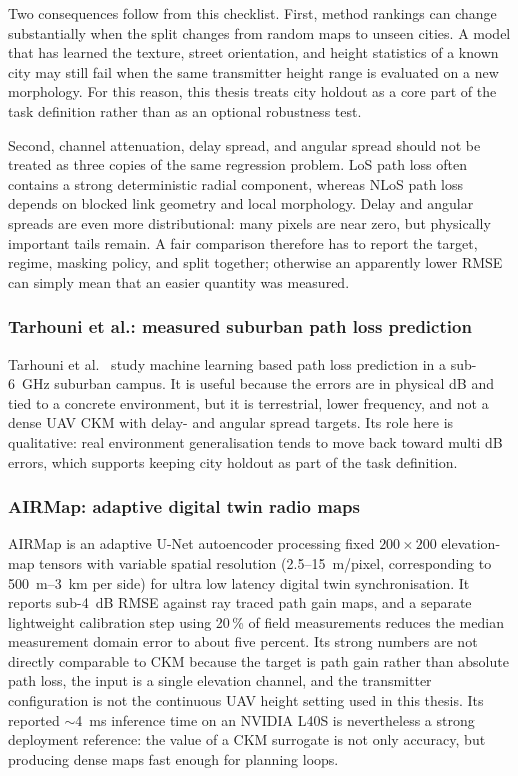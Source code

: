 Two consequences follow from this checklist. First, method rankings can change
substantially when the split changes from random maps to unseen cities. A model
that has learned the texture, street orientation, and height statistics of a
known city may still fail when the same transmitter height range is evaluated
on a new morphology. For this reason, this thesis treats city holdout as a
core part of the task definition rather than as an optional robustness test.

Second, channel attenuation, delay spread, and angular spread should not be treated as
three copies of the same regression problem. LoS path loss often contains a
strong deterministic radial component, whereas NLoS path loss depends on
blocked link geometry and local morphology. Delay and angular spreads are even
more distributional: many pixels are near zero, but physically important tails
remain. A fair comparison therefore has to report the target, regime, masking
policy, and split together; otherwise an apparently lower RMSE can simply mean
that an easier quantity was measured.

\subsubsection{Tarhouni et al.: measured suburban path loss prediction}

Tarhouni et al.\ \cite{tarhouni2025} study machine learning based path loss
prediction in a sub-\SI{6}{GHz} suburban campus. It is useful because the errors
are in physical dB and tied to a concrete environment, but it is terrestrial,
lower frequency, and not a dense UAV CKM with delay- and angular spread targets.
Its role here is qualitative: real environment generalisation tends to move
back toward multi dB errors, which supports keeping city holdout as part of the
task definition.

\subsubsection{AIRMap: adaptive digital twin radio maps}

AIRMap \cite{airmap2025} is an adaptive U-Net autoencoder processing fixed
\(200\times200\) elevation-map tensors with variable spatial resolution
(2.5--15~m/pixel, corresponding to \SI{500}{m}--\SI{3}{km} per side) for ultra low latency digital twin
synchronisation.  It reports sub-\SI{4}{dB} RMSE against ray traced path gain
maps, and a separate lightweight calibration step using 20\,\% of field
measurements reduces the median measurement domain error to about five percent.
Its strong numbers are not directly comparable to CKM because the target is path
gain rather than absolute path loss, the input is a single elevation channel,
and the transmitter configuration is not the continuous UAV height setting used
in this thesis. Its reported \(\sim\)\SI{4}{ms} inference time on an NVIDIA L40S
is nevertheless a strong deployment reference: the value of a CKM surrogate is
not only accuracy, but producing dense maps fast enough for planning loops.

